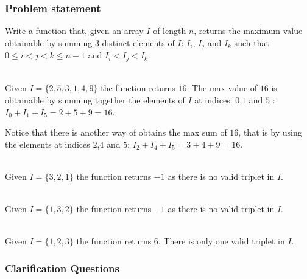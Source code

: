 \subsubsection{Problem statement}
\begin{exercise}
\label{example:max_triplet:exercice1}
Write a function that, given an array $I$ of length $n$, returns the maximum value obtainable by
summing $3$ distinct elements of $I$: $I_i$, $I_j$ and $I_k$ such that $ 0 \leq i < j < k \leq n-1$
and $ I_i < I_j < I_k $.


	\begin{example}
		\label{example:max_triplet:example1}
		\hfill \\
		Given $I = \{2, 5, 3, 1, 4, 9\}$ the function returns $16$. The max value of $16$ is
		obtainable by summing together the elements of $I$ at indices: $0$,$1$ and $5$ : $I_0 +
		I_1+I_5=2+5+9= 16$.
		
		Notice that there is another way of obtains the max sum of $16$, that is by using the
		elements at indices $2$,$4$ and $5$: $I_2 + I_4+I_5=3+4+9= 16$.
	\end{example}

	\begin{example}
		\label{example:max_triplet:example2}
		\hfill \\
		Given $I = \{3,2,1\}$ the function returns $-1$ as there is no valid triplet in $I$.		
	\end{example}
	
		\begin{example}
			\hfill \\
			Given $I = \{1,3,2\}$ the function returns $-1$ as there is no valid triplet in $I$.
			\label{ex:max_triplet:example2}	
		\end{example}

	\begin{example}
		\hfill \\
		Given $I = \{1,2,3\}$ the function returns $6$. There is only one valid triplet in $I$.
	\label{ex:max_triplet:example3}
	\end{example}
\end{exercise}

\subsubsection{Clarification Questions}

